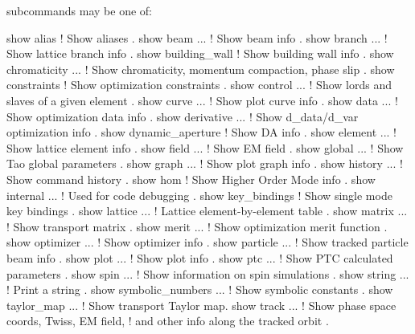 {{{{{{{ subcommands may be one of:
\begin{example}
  show alias                 ! Show aliases .
  show beam ...              ! Show beam info .
  show branch ...            ! Show lattice branch info .
  show building_wall         ! Show building wall info .
  show chromaticity ...      ! Show chromaticity, momentum compaction, phase slip .
  show constraints           ! Show optimization constraints .
  show control ...           ! Show lords and slaves of a given element .
  show curve ...             ! Show plot curve info .
  show data ...              ! Show optimization data info .
  show derivative ...        ! Show d_data/d_var optimization info .
  show dynamic_aperture      ! Show DA info .
  show element ...           ! Show lattice element info .
  show field ...             ! Show EM field .
  show global ...            ! Show Tao global parameters .
  show graph ...             ! Show plot graph info .
  show history ...           ! Show command history .
  show hom                   ! Show Higher Order Mode info .
  show internal ...          ! Used for code debugging .
  show key_bindings          ! Show single mode key bindings .
  show lattice ...           ! Lattice element-by-element table .
  show matrix ...            ! Show transport matrix .
  show merit ...             ! Show optimization merit function .
  show optimizer ...         ! Show optimizer info .
  show particle ...          ! Show tracked particle beam info .
  show plot ...              ! Show plot info .
  show ptc ...               ! Show PTC calculated parameters .
  show spin ...              ! Show information on spin simulations .
  show string ...            ! Print a string .
  show symbolic_numbers ...  ! Show symbolic constants .
  show taylor_map ...        ! Show transport Taylor map.
  show track ...             ! Show phase space coords, Twiss, EM field, 
                             !   and other info along the tracked orbit .

\end{example}}}}}}}}
